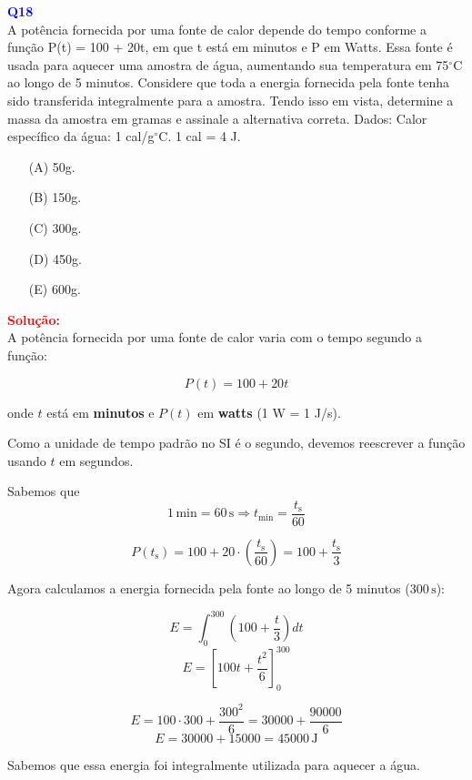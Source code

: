 \documentclass[a4paper,12pt]{article}
\begin{document}
\begin{flushleft}
\textbf{\textcolor{blue}{\Large Q18}}\\
A potência fornecida por uma fonte de calor depende do tempo conforme a função
P(t) = 100 + 20t, em que t está em minutos e P em Watts. Essa fonte é usada para aquecer uma
amostra de água, aumentando sua temperatura em 75$^{\circ}$C ao longo de 5 minutos. Considere que
toda a energia fornecida pela fonte tenha sido transferida integralmente para a amostra. Tendo
isso em vista, determine a massa da amostra em gramas e assinale a alternativa correta.
Dados:
Calor específico da água: 1 cal/g$^{\circ}$C.
1 cal = 4 J.

\begin{itemize}
\item[(A)] 50g.
\item[(B)] 150g.
\item[(C)] 300g.
\item[(D)] 450g.
\item[(E)] 600g.
\end{itemize}

\vspace{0.5cm}

\textcolor{red}{\textbf{Solução:}}\\

A potência fornecida por uma fonte de calor varia com o tempo segundo a função:

\[
P(t) = 100 + 20t
\]

onde $t$ está em \textbf{minutos} e $P(t)$ em \textbf{watts} (1 W = 1 J/s).

Como a unidade de tempo padrão no SI é o segundo, devemos reescrever a função usando $t$ em segundos.

Sabemos que $$1\,\text{min} = 60\,\text{s} \Rightarrow t_{\text{min}} = \frac{t_{\text{s}}}{60}$$

\[
P(t_{\text{s}}) = 100 + 20 \cdot \left(\frac{t_{\text{s}}}{60}\right)
= 100 + \frac{t_{\text{s}}}{3}
\]

Agora calculamos a energia fornecida pela fonte ao longo de 5 minutos ($300\,\text{s}$):

\[
E = \int_0^{300} \left(100 + \frac{t}{3} \right) dt 
\]
\[
E = \left[100t + \frac{t^2}{6} \right]_0^{300}
\]

\[
E = 100 \cdot 300 + \frac{300^2}{6} = 30000 + \frac{90000}{6}
\]
\[
E = 30000 + 15000 = 45000\,\text{J}
\]

Sabemos que essa energia foi integralmente utilizada para aquecer a água.


\end{flushleft}
\end{document}
